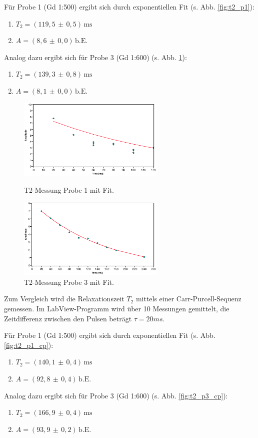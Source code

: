 \documentclass[a4paper]{scrartcl} %
\newcommand{\err}[2]{( #1 \, \pm \, #2 )} %
\newcommand{\ms}{\, \mathrm{ms}}
\newcommand{\be}{\, \mathrm{b.E.}}
\begin{document}
Für Probe 1 (Gd 1:500) ergibt sich durch exponentiellen Fit (s. Abb. \ref{fig:t2_p1}):
\begin{enumerate}
	\item[] $T_2 = \err{119,5}{0,5} \ms$
	\item[] $A = \err{8,6}{0,0} \be$
\end{enumerate}
Analog dazu ergibt sich für Probe 3 (Gd 1:600) (s. Abb. \ref{fig:t2_p3}):
\begin{enumerate}
	\item[] $T_2 = \err{139,3}{0,8} \ms$
	\item[] $A = \err{8,1}{0,0} \be$
\end{enumerate}
\begin{figure}[H]
	\centering
	\parbox{70mm}{
		\centering
		\includegraphics[width=70mm]{./Resources/t2_meas_p1.eps}
		\caption{T2-Messung Probe 1 mit Fit.}
		\label{fig:t2_p1}
	}
	\hspace*{\fill}
	\parbox{70mm}{
		\centering
		\includegraphics[width=70mm]{./Resources/t2_meas_p3.eps}
		\caption{T2-Messung Probe 3 mit Fit.}
		\label{fig:t2_p3}
	}
\end{figure}

Zum Vergleich wird die Relaxationszeit $T_2$ mittels einer Carr-Purcell-Sequenz gemessen. Im LabView-Programm wird über 10 Messungen gemittelt, die Zeitdifferenz zwischen den Pulsen beträgt $\tau = 20ms$.

Für Probe 1 (Gd 1:500) ergibt sich durch exponentiellen Fit (s. Abb. \ref{fig:t2_p1_cp}):
\begin{enumerate}
	\item[] $T_2 = \err{140,1}{0,4} \ms$
	\item[] $A = \err{92,8}{0,4} \be$
\end{enumerate}
Analog dazu ergibt sich für Probe 3 (Gd 1:600) (s. Abb. \ref{fig:t2_p3_cp}):
\begin{enumerate}
	\item[] $T_2 = \err{166,9}{0,4} \ms$
	\item[] $A = \err{93,9}{0,2} \be$
\end{enumerate}
\end{document}
